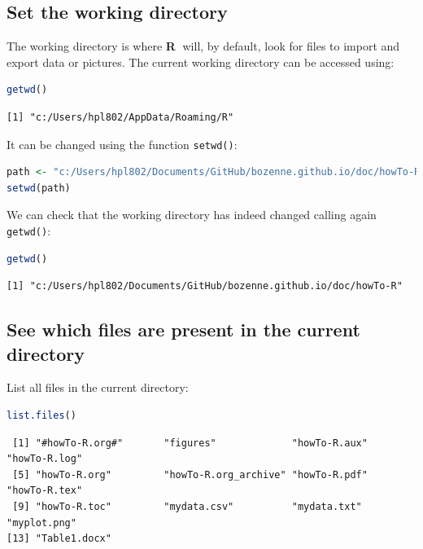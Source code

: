 \documentclass{article}
\newcommand\Rlogo{\textbf{\textsf{R}}\xspace}
\begin{document}
\subsection{Set the working directory}
\label{sec:orgab7ba65}

The working directory is where \Rlogo \(\;\) will, by default, look for files
to import and export data or pictures. The current working directory
can be accessed using:
\begin{lstlisting}[language=r,numbers=none]
getwd()
\end{lstlisting}

\label{}
\begin{verbatim}
[1] "c:/Users/hpl802/AppData/Roaming/R"
\end{verbatim}


It can be changed using the function \texttt{setwd()}:
\begin{lstlisting}[language=r,numbers=none]
path <- "c:/Users/hpl802/Documents/GitHub/bozenne.github.io/doc/howTo-R/"
setwd(path)
\end{lstlisting}

We can check that the working directory has indeed changed calling
again \texttt{getwd()}:
\begin{lstlisting}[language=r,numbers=none]
getwd()
\end{lstlisting}

\label{}
\begin{verbatim}
[1] "c:/Users/hpl802/Documents/GitHub/bozenne.github.io/doc/howTo-R"
\end{verbatim}
\subsection{See which files are present in the current directory}
\label{sec:org831d569}

List all files in the current directory:
\begin{lstlisting}[language=r,numbers=none]
list.files() 
\end{lstlisting}

\label{}
\begin{verbatim}
 [1] "#howTo-R.org#"       "figures"             "howTo-R.aux"         "howTo-R.log"        
 [5] "howTo-R.org"         "howTo-R.org_archive" "howTo-R.pdf"         "howTo-R.tex"        
 [9] "howTo-R.toc"         "mydata.csv"          "mydata.txt"          "myplot.png"         
[13] "Table1.docx"
\end{verbatim}
\end{document}
